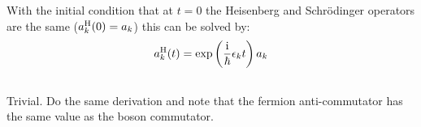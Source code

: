 \documentclass[11pt, english, fleqn, DIV=15, headinclude, BCOR=1.5cm]{scrartcl}
\begin{document}
With the initial condition that at $t = 0$ the Heisenberg and Schrödinger
operators are the same ($a_k^{\text H}(0) = a_k$) this can be solved by:
\[
    a_k^{\text H}(t) = \exp\left( \frac{\mathrm i}\hbar \epsilon_k t \right) a_k
\]

\subsection{}

Trivial. Do the same derivation and note that the fermion anti-commutator has
the same value as the boson commutator.
\end{document}
